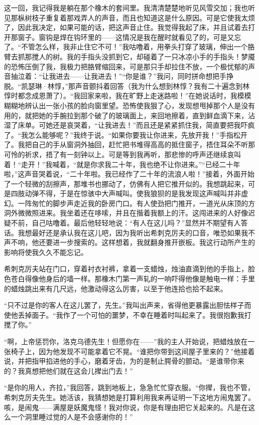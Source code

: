 \par 这一回，我记得我是躺在那个橡木的套间里。我清清楚楚地听见风雪交加；我也听见那枞树枝子重复着那戏弄人的声音，而且也知道这是什么原因。可是它使我太烦了，因此我决定，如果可能的话，把这声音止住。我觉得我起了床，并且试着去打开那窗子。窗钩是焊在钩环里的——这情况是我在醒时就看见了的，可是又忘了。“不管怎么样，我非止住它不可！”我咕噜着，用拳头打穿了玻璃，伸出一个胳臂去抓那搅人的树。我的手指头没抓到它，却碰着了一只冰凉小手的手指头！梦魇的恐怖压倒了我，我极力把胳臂缩回来，可是那只手却拉住不放，一个极忧郁的声音抽泣着：“让我进去——让我进去！”“你是谁？”我问，同时拼命想把手挣脱。“凯瑟琳·林惇，”那声音颤抖着回答（我为什么想到林惇？我有二十遍念到林惇时都念成恩萧了）。“我回家来啦，我在旷野上走迷路啦！”在她说话时，我模模糊糊地辨认出一张小孩的脸向窗里望。恐怖使我狠了心，发现想甩掉那个人是没有用的，就把她的手腕拉到那个破了的玻璃面上，来回地擦着，直到鲜血滴下来，沾湿了床单。可她还是哀哭着，“让我进去！”而且还是紧紧抓住我，简直要把我吓疯了。“我怎么能够呢？”我终于说。“如果你要我让你进来，先放开我！”手指松开了。我把自己的手从窗洞外抽回，赶忙把书堆得高高的抵住窗子，捂住耳朵不听那可怜的祈求，捂了有一刻钟以上。可是等到我再听，那悲惨的呼声还继续哀叫着！“走开！”我喊着，“就是你求我二十年，我也绝不让你进来。”“已经二十年啦，”这声音哭着说，“二十年啦。我已经作了二十年的流浪人啦！”接着，外面开始了一个轻微的刮擦声，那堆书也挪动了，仿佛有人把它推开似的。我想跳起来，可是四肢动弹不得，于是在惊骇中大声喊叫。使我狼狈的是我发现这声喊叫并非虚幻。一阵匆忙的脚步声走近我的卧房门口。有人使劲把门推开，一道光从床顶的方洞外微微照进来。我坐着还在哆嗦，并且在揩着我额上的汗。这闯进来的人好像迟疑不前，自己咕噜着。最后他轻轻地说：“有人在这儿吗？”显然并不期望有人答话。我想最好还是承认我在这儿吧，因为我听出希刺克厉夫的口音，唯恐如果我不声不响，他还要进一步搜索的。这样想着，我就翻身推开嵌板。我这行动所产生的影响将使我久久不能忘记。
\par 希刺克厉夫站在门口，穿着衬衣衬裤，拿着一支蜡烛，烛油直滴到他的手指上，脸色苍白得像他身后的墙一样。那橡木门第一声轧的一响吓得他像是触电一样：手里的蜡烛跳出来有几尺远，他激动得这么厉害，以至于他连拾也拾不起来。
\par “只不过是你的客人在这儿罢了，先生。”我叫出声来，省得他更暴露出胆怯样子而使他丢掉面子。“我作了一个可怕的噩梦，不幸在睡着时叫起来了。我很抱歉我打搅了你。”
\par “啊，上帝惩罚你，洛克乌德先生！但愿你在——”我的主人开始说，把蜡烛放在一张椅子上，因为他发现不可能拿着它不晃。“谁把你带到这间屋子里来的？”他接着说，并把指甲掐进他的手心，磨着牙齿，为的是制止腭骨的颤动。“是谁带你来的？我真想把他们就在这会儿撵出门去！”
\par “是你的用人，齐拉，”我回答，跳到地板上，急急忙忙穿衣服。“你撵，我也不管，希刺克厉夫先生。她活该，我猜想她是打算利用我来再证明一下这地方闹鬼罢了。咳，是闹鬼——满屋是妖魔鬼怪！我对你说，你是有理由把它关起来的。凡是在这么一个洞里睡过觉的人是不会感谢你的！”
